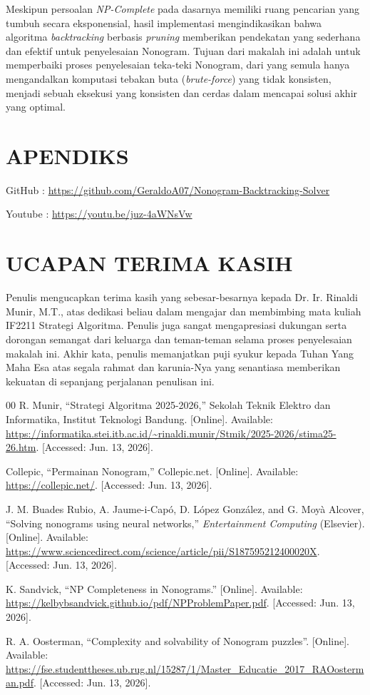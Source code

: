 \documentclass[conference]{IEEEtran}
\begin{document}
Meskipun persoalan \textit{NP-Complete} pada dasarnya memiliki ruang pencarian yang tumbuh secara eksponensial, hasil implementasi mengindikasikan bahwa algoritma \textit{backtracking} berbasis \textit{pruning} memberikan pendekatan yang sederhana dan efektif untuk penyelesaian Nonogram. Tujuan dari makalah ini adalah untuk memperbaiki proses penyelesaian teka-teki Nonogram, dari yang semula hanya mengandalkan komputasi tebakan buta (\textit{brute-force}) yang tidak konsisten, menjadi sebuah eksekusi yang konsisten dan cerdas dalam mencapai solusi akhir yang optimal.

\section{APENDIKS}
GitHub : \href{https://github.com/GeraldoA07/Nonogram-Backtracking-Solver}{https://github.com/GeraldoA07/Nonogram-Backtracking-Solver}

Youtube : \href{https://youtu.be/juz-4aWNsVw}{https://youtu.be/juz-4aWNsVw}

\section{UCAPAN TERIMA KASIH}
Penulis mengucapkan terima kasih yang sebesar-besarnya kepada Dr. Ir. Rinaldi Munir, M.T., atas dedikasi beliau dalam mengajar dan membimbing mata kuliah IF2211 Strategi Algoritma. Penulis juga sangat mengapresiasi dukungan serta dorongan semangat dari keluarga dan teman-teman selama proses penyelesaian makalah ini. Akhir kata, penulis memanjatkan puji syukur kepada Tuhan Yang Maha Esa atas segala rahmat dan karunia-Nya yang senantiasa memberikan kekuatan di sepanjang perjalanan penulisan ini. 

\begin{thebibliography}{00}
 R. Munir, ``Strategi Algoritma 2025-2026,'' Sekolah Teknik Elektro dan Informatika, Institut Teknologi Bandung. [Online]. Available: \url{https://informatika.stei.itb.ac.id/~rinaldi.munir/Stmik/2025-2026/stima25-26.htm}. [Accessed: Jun. 13, 2026].

 Collepic, ``Permainan Nonogram,'' Collepic.net. [Online]. Available: \url{https://collepic.net/}. [Accessed: Jun. 13, 2026].

 J. M. Buades Rubio, A. Jaume-i-Capó, D. López González, and G. Moyà Alcover, ``Solving nonograms using neural networks,'' \textit{Entertainment Computing} (Elsevier). [Online]. Available: \url{https://www.sciencedirect.com/science/article/pii/S187595212400020X}. [Accessed: Jun. 13, 2026].

 K. Sandvick, ``NP Completeness in Nonograms.'' [Online]. Available: \url{https://kelbybsandvick.github.io/pdf/NPProblemPaper.pdf}. [Accessed: Jun. 13, 2026].

 R. A. Oosterman, ``Complexity and solvability of Nonogram puzzles''. [Online]. Available: \url{https://fse.studenttheses.ub.rug.nl/15287/1/Master_Educatie_2017_RAOosterman.pdf}. [Accessed: Jun. 13, 2026].
\end{thebibliography}
\end{document}
